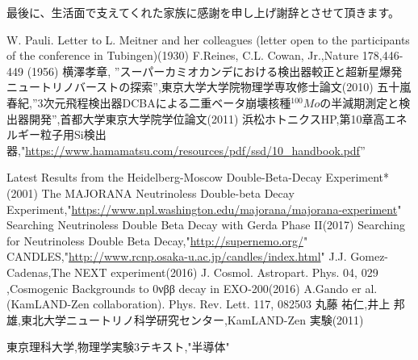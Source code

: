 \documentclass[a4paper,10pt]{jreport}
\begin{document}
最後に、生活面で支えてくれた家族に感謝を申し上げ謝辞とさせて頂きます。




\begin{thebibliography}{9}
 W. Pauli. Letter to L. Meitner and her colleagues (letter open to the participants of the conference in Tubingen)(1930)
 F.Reines, C.L. Cowan, Jr.,Nature 178,446-449 (1956)
 横澤孝章, ''スーパーカミオカンデにおける検出器較正と超新星爆発ニュートリノバーストの探索'',東京大学大学院物理学専攻修士論文(2010)
五十嵐春紀,''3次元飛程検出器DCBAによる二重ベータ崩壊核種$^{100}Mo$の半減期測定と検出器開発'',首都大学東京大学院学位論文(2011)
浜松ホトニクスHP,第10章高エネルギー粒子用Si検出器,"\url{https://www.hamamatsu.com/resources/pdf/ssd/10_handbook.pdf}''

Latest Results from the Heidelberg-Moscow Double-Beta-Decay Experiment*(2001)
The MAJORANA Neutrinoless Double-beta Decay Experiment,"\url{https://www.npl.washington.edu/majorana/majorana-experiment}"
Searching Neutrinoless Double Beta Decay with Gerda Phase II(2017)
Searching for Neutrinoless Double Beta Decay,"\url{http://supernemo.org/}"
CANDLES,"\url{http://www.rcnp.osaka-u.ac.jp/candles/index.html}"
J.J. Gomez-Cadenas,The NEXT experiment(2016)
J. Cosmol. Astropart. Phys. 04, 029 ,Cosmogenic Backgrounds to 0νββ decay in EXO-200(2016)
A.Gando er al.(KamLAND-Zen collaboration). Phys. Rev. Lett. 117, 082503 
丸藤 祐仁,井上 邦雄,東北大学ニュートリノ科学研究センター,KamLAND-Zen 実験(2011)

東京理科大学,物理学実験3テキスト,"半導体"
\end{thebibliography}
\end{document}
